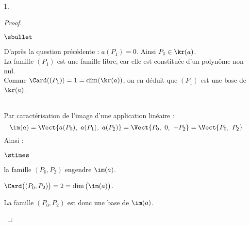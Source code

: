 \documentclass[11pt]{article}%
\begin{document}
\begin{noliste}{1.}
\begin{proof}
\begin{noliste}{$\sbullet$}
      \newpage


      \noindent
      D'après la question précédente : $a(P_1) = 0$. Ainsi $P_1 \in
      \kr(a)$. \\
      La famille $(P_1)$ est une famille libre, car elle est
      constituée d'un polynôme non nul.\\
      Comme $\Card( (P_1) ) = 1 = \dim(\kr(a))$, on en déduit que
      $(P_1)$ est une base de $\kr(a)$.\\[-.2cm] %
      ~\\[-.6cm]
      
    \item Par caractérisation de l'image d'une application linéaire :
      \[
      \im(a) =\Vect{a(P_0), \ a(P_1), \ a(P_2)} = \Vect{P_0, \ 0, \ -P_2}
      = \Vect{P_0, \ P_2}
      \]
      Ainsi :
      \begin{noliste}{$\stimes$}
      \item la famille $(P_0,P_2)$ engendre $\im(a)$.
      \item $\Card\big( (P_0,P_2) \big) = 2 = \dim\big( \im(a) \big)$.
      \end{noliste}
      La famille $(P_0,P_2)$ est donc une base de $\im(a)$. %
    \end{noliste}
    

\end{proof}
\end{noliste}
\end{document}
